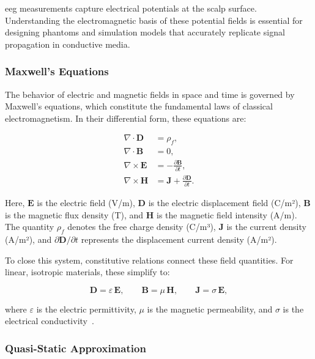 \gls{eeg} measurements capture electrical potentials at the scalp surface. Understanding the electromagnetic basis of these potential fields is essential for designing phantoms and simulation models that accurately replicate signal propagation in conductive media.

\subsubsection{Maxwell's Equations}

The behavior of electric and magnetic fields in space and time is governed by Maxwell's equations, which constitute the fundamental laws of classical electromagnetism. In their differential form, these equations are:

\begin{align}
\nabla \cdot \mathbf{D} &= \rho_f, \label{eq:gauss_electric} \\[6pt]
\nabla \cdot \mathbf{B} &= 0, \label{eq:gauss_magnetic} \\[6pt]
\nabla \times \mathbf{E} &= -\frac{\partial \mathbf{B}}{\partial t}, \label{eq:faraday} \\[6pt]
\nabla \times \mathbf{H} &= \mathbf{J} + \frac{\partial \mathbf{D}}{\partial t}.
\label{eq:ampere_maxwell}
\end{align}

Here, $\mathbf{E}$ is the electric field (V/m), $\mathbf{D}$ is the electric displacement field (C/m²), $\mathbf{B}$ is the magnetic flux density (T), and $\mathbf{H}$ is the magnetic field intensity (A/m). The quantity $\rho_f$ denotes the free charge density (C/m³), $\mathbf{J}$ is the current density (A/m²), and $\partial \mathbf{D} / \partial t$ represents the displacement current density (A/m²).

To close this system, constitutive relations connect these field quantities. For linear, isotropic materials, these simplify to:

\[
\mathbf{D} = \varepsilon\,\mathbf{E}, \qquad
\mathbf{B} = \mu\,\mathbf{H}, \qquad
\mathbf{J} = \sigma\,\mathbf{E},
\]

where $\varepsilon$ is the electric permittivity, $\mu$ is the magnetic permeability, and $\sigma$ is the electrical conductivity~\cite{feynman_2011,weik-2000,jackson-1999,griffiths-2017}.

\subsubsection{Quasi-Static Approximation}

